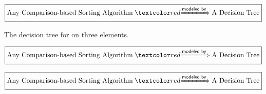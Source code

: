 \begin{frame}{}
  \begin{center}
    {\Large {}} 
  \end{center}

  \vspace{-0.40cm}
  \[
    \boxed{\text{Any Comparison-based Sorting Algorithm} \;\red{\xRightarrow{ \textsf{modeled by} }}\; \text{A Decision Tree}}
  \]

  \pause
  \centerline{The decision tree for  on three elements.}
\end{frame}

\begin{frame}{}
  \begin{center}
    {\Large {}} 
  \end{center}

  \vspace{-0.40cm}
  \[
    \boxed{\text{Any Comparison-based Sorting Algorithm} \;\red{\xRightarrow{ \textsf{modeled by} }}\; \text{A Decision Tree}}
  \]

  
\end{frame}

\begin{frame}{}
  \begin{center}
    {\Large {}} 
  \end{center}

  \vspace{-0.40cm}
  \[
    \boxed{\text{Any Comparison-based Sorting Algorithm} \;\red{\xRightarrow{ \textsf{modeled by} }}\; \text{A Decision Tree}}
  \]

\end{frame}

